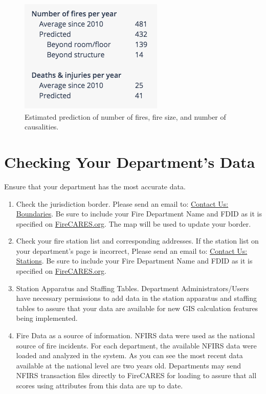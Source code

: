 \documentclass[12pt,oneside]{book}
\begin{document}
\begin{figure}[ht!]
\centering
\includegraphics[width=.5\columnwidth]{Figures/fire_predictions}
\caption{Estimated prediction of number of fires, fire size, and number of causalities.}
\label{fig:fire_predictions}
\end{figure}

\chapter{Checking Your Department's Data}

Ensure that your department has the most accurate data.

\begin{enumerate}
\item Check the jurisdiction border. Please send an email to: \href{mailto:boundaries@firecares.org}{Contact Us: Boundaries}. Be sure to include your Fire Department Name and FDID as it is specified on \href{https://www.FireCARES.org}{FireCARES.org}. The map will be used to update your border.

\item Check your fire station list and corresponding addresses. If the station list on your department's page is incorrect, Please send an email to: \href{mailto:stations@firecares.org}{Contact Us: Stations}. Be sure to include your Fire Department Name and FDID as it is specified on \href{https://www.FireCARES.org}{FireCARES.org}.

\item Station Apparatus and Staffing Tables. Department Administrators/Users have necessary permissions to add data in the station apparatus and staffing tables to assure that your data are available for new GIS calculation features being implemented. 

\item Fire Data as a source of information. NFIRS data were used as the national source of fire incidents. For each department, the available NFIRS data were loaded and analyzed in the system.  As you can see the most recent data available at the national level are two years old. Departments may send NFIRS transaction files directly to FireCARES for loading to assure that all scores using attributes from this data are up to date.  

\end{enumerate}
\end{document}
